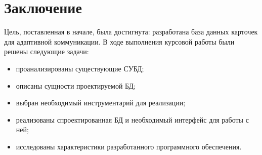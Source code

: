 \chapter*{Заключение}

Цель, поставленная в начале, была достигнута: разработана база данных карточек для адаптивной коммуникации. В ходе выполнения курсовой работы были решены следующие задачи:

\begin{itemize}
	\item проанализированы существующие СУБД;
	\item описаны сущности проектируемой БД;
	\item выбран необходимый инструментарий для реализации;
	\item реализованы спроектированная БД и необходимый интерфейс для работы с ней;
	\item исследованы характеристики разработанного программного обеспечения.
\end{itemize}
